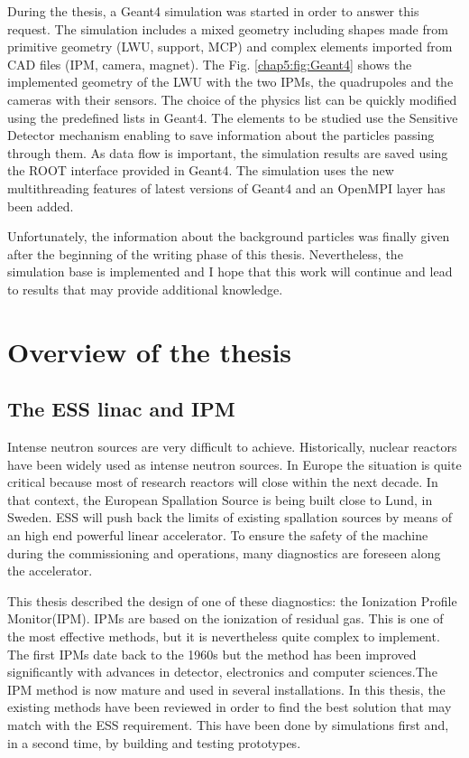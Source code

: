 \begin{refsection}
  
  During the thesis, a Geant4 simulation was started in order to answer this request. The simulation includes a mixed geometry including shapes made from primitive geometry (LWU, support, MCP) and complex elements imported from CAD files (IPM, camera, magnet). The Fig. \ref{chap5:fig:Geant4} shows the implemented geometry of the LWU with the two IPMs, the quadrupoles and the cameras with their sensors. The choice of the physics list can be quickly modified using the predefined lists in Geant4. The elements to be studied use the Sensitive Detector mechanism enabling to save information about the particles passing through them. As data flow is important, the simulation results are saved using the ROOT interface provided in Geant4. The simulation uses the new multithreading features of latest versions of Geant4 and an OpenMPI layer has been added.

  Unfortunately, the information about the background particles was finally given after the beginning of the writing phase of this thesis. Nevertheless, the simulation base is implemented and I hope that this work will continue and lead to results that may provide additional knowledge.

  \section{Overview of the thesis}

  \subsection{The ESS linac and IPM}
  Intense neutron sources are very difficult to achieve. Historically, nuclear reactors have been widely used as intense neutron sources. In Europe the situation is quite critical because most of research reactors will close within the next decade. In that context, the European Spallation Source is being built close to Lund, in Sweden. ESS will push back the limits of existing spallation sources by means of an high end powerful linear accelerator. To ensure the safety of the machine during the commissioning and operations, many diagnostics are foreseen along the accelerator. 
  
  This thesis described the design of one of these diagnostics: the Ionization Profile Monitor(IPM). IPMs are based on the ionization of residual gas. This is one of the most effective methods, but it is nevertheless quite complex to implement. The first IPMs date back to the 1960s but the method has been improved significantly with advances in detector, electronics and computer sciences.The IPM method is now mature and used in several installations. In this thesis, the existing methods have been reviewed in order to find the best solution that may match with the ESS requirement. This have been done by simulations first and, in a second time, by building and testing prototypes.


\end{refsection}
